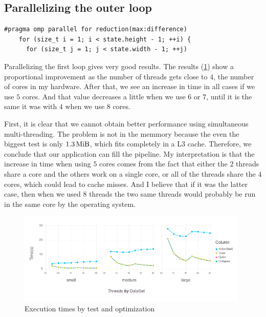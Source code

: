 \documentclass[
    12pt, %
]{fphw}
\begin{document}
\subsection{Parallelizing the outer loop}

\begin{lstlisting}[gobble=4]
    #pragma omp parallel for reduction(max:difference)
    for (size_t i = 1; i < state.height - 1; ++i) {
      for (size_t j = 1; j < state.width - 1; ++j)

\end{lstlisting}

    Parallelizing the first loop gives very good results.
The results (\cref{fig:parallelization-results}) show a proportional improvement
as the number of threads gets close to $4$, the number of cores in my hardware.
After that, we see an increase in time in all cases if we use $5$ cores.
And that value decreases a little when we use $6$ or $7$,
until it is the same it was with $4$ when we use $8$ cores.

    First, it is clear that we cannot
obtain better performance using simultaneous multi-threading.
The problem is not in the memmory because the even the biggest
test is only $\SI{1.3}{\mebi\byte}$,
which fits completely in a L3 cache.
Therefore, we conclude that our application can fill the pipeline.
My interpretation is that the increase in time when using $5$ cores
comes from the fact that either the $2$ threads share a core and
the others work on a single core,
or all of the threads share the $4$ cores, which could lead to cache misses.
And I believe that if it was the latter case,
then when we used $8$ threads the two same threads would probably
be run in the same core by the operating system.

\begin{figure}[h]
    \centering
    \includegraphics[width=0.98\textwidth]{prac2/times-plot.png}
    \caption{Execution times by test and optimization}
    \label{fig:parallelization-results}
\end{figure}
\end{document}
